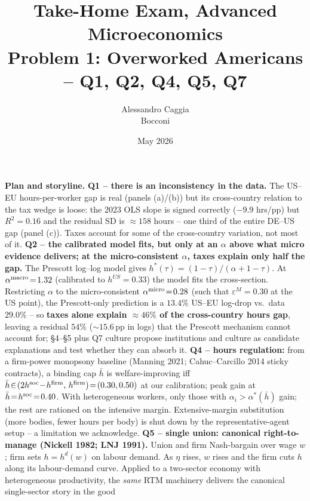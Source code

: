 \documentclass[9pt,a4paper]{extarticle}
\title{\vspace{-2em}\textbf{Take-Home Exam, Advanced Microeconomics}\\[0.2em]
\large Problem 1: Overworked Americans -- Q1, Q2, Q4, Q5, Q7}
\author{Alessandro Caggia\\\small Bocconi}
\date{May 2026}
\begin{document}
\maketitle
\vspace{-2.5em}

\begin{planbox}
\small\textbf{Plan and storyline.}
\textbf{Q1 -- there is an inconsistency in the data.} The US--EU
hours-per-worker gap is real (panels (a)/(b)) but its cross-country
relation to the tax wedge is loose: the 2023 OLS slope is signed
correctly ($-9.9$ hrs/pp) but $R^2\!=\!0.16$ and the residual SD is
$\approx 158$ hours -- one third of the entire DE--US gap (panel (c)).
Taxes account for some of the cross-country variation, not most of it.
\textbf{Q2 -- the calibrated model fits, but only at an $\alpha$ above
what micro evidence delivers; at the micro-consistent $\alpha$, taxes
explain only half the gap.} The Prescott log--log model gives
$h^\ast(\tau)=(1-\tau)/(\alpha+1-\tau)$. At
$\alpha^{\rm macro}\!=\!1.32$ (calibrated to $h^{US}\!=\!0.33$) the
model fits the cross-section. Restricting $\alpha$ to the
micro-consistent $\alpha^{\rm micro}\!=\!0.28$ (such that
$\varepsilon^M\!=\!0.30$ at the US point), the Prescott-only
prediction is a $13.4\%$ US--EU log-drop vs.\ data $29.0\%$ -- so
\textbf{taxes alone explain $\approx\!46\%$ of the cross-country
hours gap}, leaving a residual $54\%$ ($\sim\!15.6$\,pp in logs)
that the Prescott mechanism cannot account for; \S 4--\S 5 plus Q7 culture propose
institutions and culture as candidate explanations and test
whether they can absorb it.
\textbf{Q4 -- hours regulation:} from a firm-power monopsony
baseline (Manning 2021; Cahuc--Carcillo 2014 sticky contracts), a
binding cap $\bar h$ is welfare-improving iff
$\bar h\!\in\!(2h^\text{soc}\!-\!h^{\rm firm},\,h^{\rm firm})\!=\!(0.30,0.50)$
at our calibration; peak gain at
$\bar h\!=\!h^{\rm soc}\!=\!0.40$. With heterogeneous workers, only
those with $\alpha_i\!>\!\alpha^*(\bar h)$ gain; the rest are
rationed on the intensive margin. Extensive-margin substitution
(more bodies, fewer hours per body) is shut down by the
representative-agent setup -- a limitation we acknowledge.
\textbf{Q5 -- single union: canonical right-to-manage (Nickell 1982;
LNJ 1991).} Union and firm Nash-bargain over wage $w$; firm sets
$h\!=\!h^d(w)$ on labour demand. As $\eta$ rises, $w$ rises and the
firm cuts $h$ along its labour-demand curve. Applied to a two-sector
economy with heterogeneous productivity, the \emph{same} RTM
machinery delivers the canonical single-sector story in the good

\end{planbox}
\end{document}
